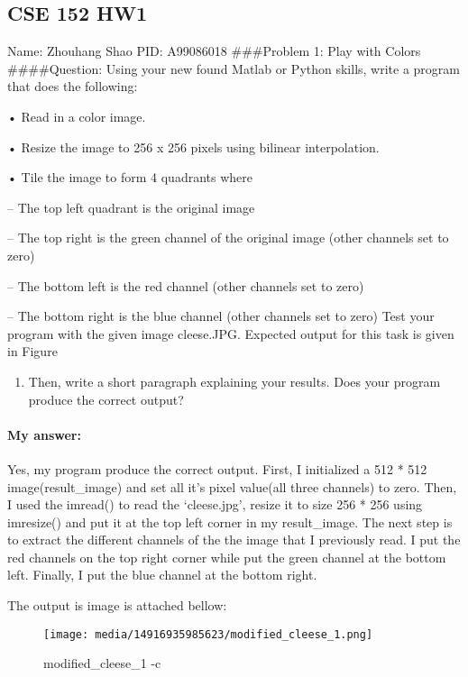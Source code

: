 \documentclass[]{article}
\date{}
\providecommand{\tightlist}{%
  \setlength{\itemsep}{0pt}\setlength{\parskip}{0pt}}
\let\oldparagraph\paragraph
\renewcommand{\paragraph}[1]{\oldparagraph{#1}\mbox{}}
\begin{document}
\subsection{CSE 152 HW1}\label{cse-152-hw1}

Name: Zhouhang Shao PID: A99086018 \#\#\#Problem 1: Play with Colors
\#\#\#\#Question: Using your new found Matlab or Python skills, write a
program that does the following:

• Read in a color image.

• Resize the image to 256 x 256 pixels using bilinear interpolation.

• Tile the image to form 4 quadrants where

-- The top left quadrant is the original image

-- The top right is the green channel of the original image (other
channels set to zero)

-- The bottom left is the red channel (other channels set to zero)

-- The bottom right is the blue channel (other channels set to zero)
Test your program with the given image cleese.JPG. Expected output for
this task is given in Figure

\begin{enumerate}
\def\labelenumi{\arabic{enumi}.}
\tightlist
\item
  Then, write a short paragraph explaining your results. Does your
  program produce the correct output?
\end{enumerate}

\paragraph{My answer:}\label{my-answer}

Yes, my program produce the correct output. First, I initialized a 512 *
512 image(result\_image) and set all it's pixel value(all three
channels) to zero. Then, I used the imread() to read the `cleese.jpg',
resize it to size 256 * 256 using imresize() and put it at the top left
corner in my result\_image. The next step is to extract the different
channels of the the image that I previously read. I put the red channels
on the top right corner while put the green channel at the bottom left.
Finally, I put the blue channel at the bottom right.

The output is image is attached bellow:

\begin{figure}
\centering
\texttt{[image: media/14916935985623/modified\_cleese\_1.png]}
\caption{modified\_cleese\_1 -c}
\end{figure}
\end{document}
